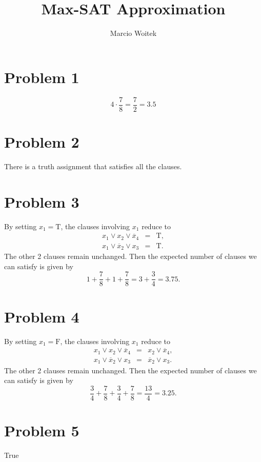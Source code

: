 \documentclass[11pt]{article}
\author{Marcio Woitek}
\date{}
\title{Max-SAT Approximation}
\begin{document}
\maketitle
\thispagestyle{empty}

\section*{Problem 1}
\label{sec:org4b82ee7}
\begin{equation}
4 \cdot \frac{7}{8} = \frac{7}{2} = 3.5
\end{equation}

\section*{Problem 2}
\label{sec:org971d99f}
There is a truth assignment that satisfies all the clauses.

\section*{Problem 3}
\label{sec:org6046d4a}
By setting \(x_1 = \mathrm{T}\), the clauses involving \(x_1\) reduce to
\begin{eqnarray*}
x_1 \vee x_2 \vee \overline{x}_4 &=& \mathrm{T}, \\
x_1 \vee \overline{x}_2 \vee x_3 &=& \mathrm{T}.
\end{eqnarray*}
The other 2 clauses remain unchanged. Then the expected number of clauses we can
satisfy is given by
\begin{equation}
1 + \frac{7}{8} + 1 + \frac{7}{8} = 3 + \frac{3}{4} = 3.75.
\end{equation}

\section*{Problem 4}
\label{sec:org3ca18c3}
By setting \(x_1 = \mathrm{F}\), the clauses involving \(x_1\) reduce to
\begin{eqnarray*}
x_1 \vee x_2 \vee \overline{x}_4 &=& x_2 \vee \overline{x}_4, \\
x_1 \vee \overline{x}_2 \vee x_3 &=& \overline{x}_2 \vee x_3.
\end{eqnarray*}
The other 2 clauses remain unchanged. Then the expected number of clauses we can
satisfy is given by
\begin{equation}
\frac{3}{4} + \frac{7}{8} + \frac{3}{4} + \frac{7}{8} = \frac{13}{4} = 3.25.
\end{equation}

\section*{Problem 5}
\label{sec:org67f1ca4}
True
\end{document}
